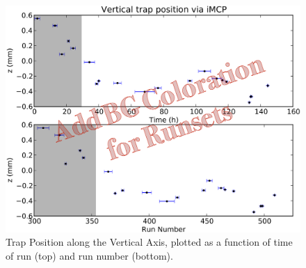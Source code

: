 \begin{figure}[h!!t]
	\centering
	\includegraphics[width=.999\linewidth]
	{Figures/VerticalTrap_by_rMCP_prelim}
	\caption[Vertical Trap Position from rMCP]{Trap Position along the Vertical Axis, plotted as a function of time of run (top) and run number (bottom).}	
	\label{fig:vposition_by_run_rmcp}
\end{figure}



\FloatBarrier
